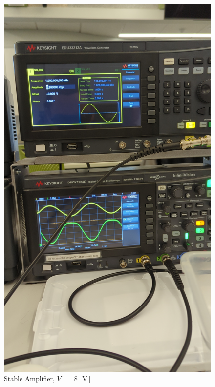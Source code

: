 \documentclass[
	letterpaper, %
	10pt, %
]{CSUniSchoolLabReport}
\begin{document}
\begin{figure}[H]
  \centering
  \includegraphics[width=.9\textwidth]{Figures/L4F3}
  \caption{Stable Amplifier, $V^{+}=8[\si{\volt}]$}
  \label{fig:5}
\end{figure}
\end{document}
